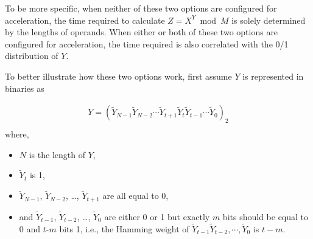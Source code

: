 \documentclass[main\_\_EN.tex]{subfiles}
\begin{document}
To be more specific, when neither of these two options are configured for acceleration, the time required to calculate \begin{math}Z = X^{Y} \bmod M\end{math} is solely determined by the lengths of operands. When either or both of these two options are configured for acceleration, the time required is also correlated with the 0/1 distribution of \begin{math}Y\end{math}.

To better illustrate how these two options work, first assume \begin{math}Y \end{math} is represented in binaries as

\begin{gather*}
Y = ( \widetilde{Y}_{N-1} \widetilde{Y}_{N-2} \cdots \widetilde{Y}_{t+1} \widetilde{Y}_{t} \widetilde{Y}_{t-1} \cdots \widetilde{Y}_{0} )_{2} \\
\end{gather*}
where,
\begin{itemize}
    \item \begin{math} N \end{math} is the length of \begin{math}Y \end{math},
    \item \begin{math}\widetilde{Y}_{t}\end{math} is 1,
    \item \begin{math}\widetilde{Y}_{N-1}\end{math}, \begin{math}\widetilde{Y}_{N-2}\end{math}, \dots, \begin{math}\widetilde{Y}_{t+1}\end{math} are all equal to 0,
    \item and \begin{math}\widetilde{Y}_{t-1}\end{math}, \begin{math}\widetilde{Y}_{t-2}\end{math}, \dots, \begin{math}\widetilde{Y}_{0}\end{math} are either 0 or 1 but exactly \begin{math}m\end{math} bits should be equal to 0 and \begin{math}t\end{math}-\begin{math}m\end{math} bits 1, i.e., the Hamming weight of \begin{math}\widetilde{Y}_{t-1} \widetilde{Y}_{t-2}, \cdots, \widetilde{Y}_{0}\end{math} is \begin{math}t -m\end{math}.
\end{itemize}
\end{document}
